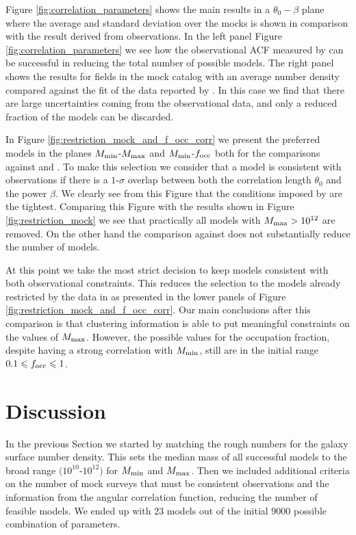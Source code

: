 \documentclass[usenatbib]{mn2e}
\newcommand{\hMsun}{{\ifmmode{h^{-1}{\rm
        {M_{\odot}}}}\else{$h^{-1}{\rm{M_{\odot}}}$}\fi}}
\begin{document}
{Figure \ref{fig:correlation_parameters} shows the main results in a
$\theta_{0}-\beta$  plane where the average and standard deviation
over the mocks is shown in comparison with the result derived from
observations. In the left panel Figure \ref{fig:correlation_parameters} we see
how the observational ACF measured by \cite{Hayashino2004} 
can be successful in reducing the total number of possible models. The
right panel shows the results for fields in the mock catalog with an
average number density compared against the fit of the data
reported by \cite{Ouchi2010}. In this case we find that there are
large uncertainties coming from the observational data, and only a reduced
fraction of the models can be discarded.


In Figure \ref{fig:restriction_mock_and_f_occ_corr} we present the preferred
models in the planes $M_{\rm min}$-$M_{\rm  max}$ and $M_{\rm min}$-$f_{\rm occ}$
both for the comparisons against \cite{Hayashino2004} and
\cite{Ouchi2010}. To make this selection we consider that
a model is consistent with observations if there is a $1$-$\sigma$
overlap between both the correlation length $\theta_0$ and the power
$\beta$. We clearly see from this Figure that the conditions imposed
by \cite{Hayashino2004} are the tightest. Comparing this Figure with
the results shown in Figure \ref{fig:restriction_mock} we see that
practically all models with $M_{\rm max}>10^{12}$ are removed. On the
other hand the comparison against \cite{Ouchi2010} does not
substantially reduce the number of models. 

At this point we take the most strict decision to keep 
models consistent with both observational constraints. This
reduces the selection to the models already restricted by
the data in \cite{Hayashino2004} as presented in the lower panels of Figure
\ref{fig:restriction_mock_and_f_occ_corr}. Our main conclusions after
this comparison is that clustering information is able to put
meaningful constraints on the values of $M_{\rm max}$. However, the
possible values for the occupation fraction, despite having a strong correlation
with $M_{\rm min}$, still are in the initial range $0.1\leq f_{\rm
  occ}\leq 1$. 

\section{Discussion}

In the previous Section we started by matching the rough numbers for the
galaxy surface number density. This sets the median mass of all
successful models to the broad range $(10^{10}$-$10^{12})$ \hMsun for
$M_{\rm min}$ and $M_{\rm max}$. Then we included additional criteria on the
number of mock surveys that must be consistent observations
and the information from the angular correlation function, reducing
the number of feasible models. We ended up with $23$ models out of
the initial $9000$ possible combination of parameters. 

}
\end{document}
